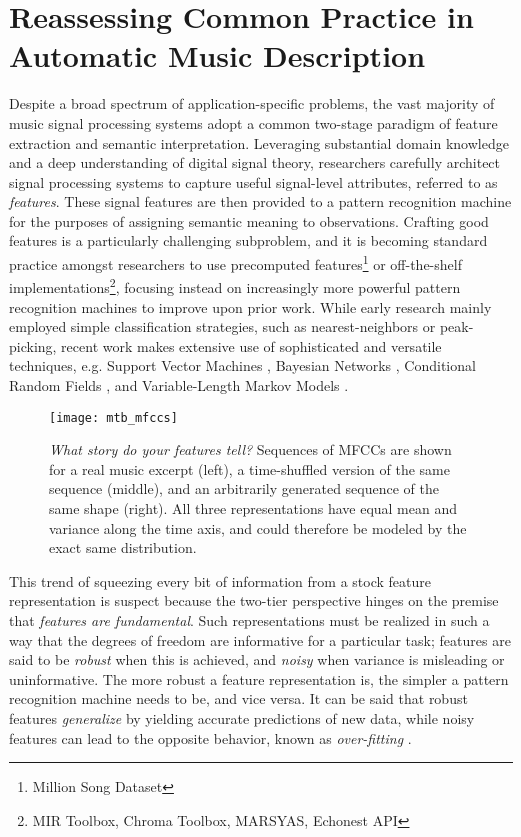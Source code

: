 \section{Reassessing Common Practice in Automatic Music Description}
\label{sec:common}

Despite a broad spectrum of application-specific problems, the vast majority of music signal processing systems adopt a common two-stage paradigm of feature extraction and semantic interpretation.
Leveraging substantial domain knowledge and a deep understanding of digital signal theory, researchers carefully architect signal processing systems to capture useful signal-level attributes, referred to as \emph{features}.
These signal features are then provided to a pattern recognition machine for the purposes of assigning semantic meaning to observations.
Crafting good features is a particularly challenging subproblem, and it is becoming standard practice amongst researchers to use precomputed features\footnote{Million Song Dataset} or off-the-shelf implementations\footnote{MIR Toolbox, Chroma Toolbox, MARSYAS, Echonest API}, focusing instead on increasingly more powerful pattern recognition machines to improve upon prior work.
While early research mainly employed simple classification strategies, such as nearest-neighbors or peak-picking, recent work makes extensive use of sophisticated and versatile techniques, e.g. Support Vector Machines \cite{Mandel2005}, Bayesian Networks \cite{Mauch2010a}, Conditional Random Fields \cite{Sumi2012}, and Variable-Length Markov Models \cite{Chordia2011}.

\begin{figure}
\begin{centering}
\texttt{[image: mtb\_mfccs]}
\caption{\emph{What story do your features tell?} Sequences of MFCCs are shown for a real music excerpt (left), a time-shuffled version of the same sequence (middle), and an arbitrarily generated sequence of the same shape (right). All three representations have equal mean and variance along the time axis, and could therefore be modeled by the exact same distribution.}
\label{fig:mfccs}
\end{centering}
\end{figure}

This trend of squeezing every bit of information from a stock feature representation is suspect because the two-tier perspective hinges on the premise that \emph{features are fundamental}.
Such representations must be realized in such a way that the degrees of freedom are informative for a particular task; features are said to be \emph{robust} when this is achieved, and \emph{noisy} when variance is misleading or uninformative.
The more robust a feature representation is, the simpler a pattern recognition machine needs to be, and vice versa.
It can be said that robust features \emph{generalize} by yielding accurate predictions of new data, while noisy features can lead to the opposite behavior, known as \emph{over-fitting} \cite{Bishop2006}.

